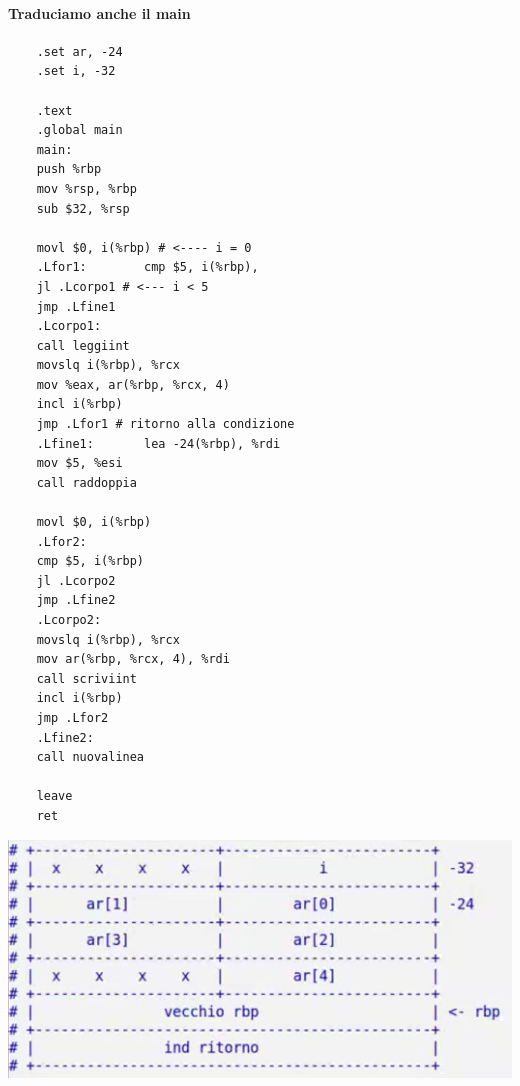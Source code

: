 \paragraph{Traduciamo anche il main}
\begin{verbatim}
	.set ar, -24
	.set i, -32
	
	.text
	.global main
	main:
	push %rbp
	mov %rsp, %rbp
	sub $32, %rsp
	
	movl $0, i(%rbp) # <---- i = 0
	.Lfor1:        cmp $5, i(%rbp), 
	jl .Lcorpo1 # <--- i < 5
	jmp .Lfine1
	.Lcorpo1:
	call leggiint
	movslq i(%rbp), %rcx
	mov %eax, ar(%rbp, %rcx, 4)
	incl i(%rbp)
	jmp .Lfor1 # ritorno alla condizione 
	.Lfine1:       lea -24(%rbp), %rdi
	mov $5, %esi
	call raddoppia
	
	movl $0, i(%rbp)
	.Lfor2:
	cmp $5, i(%rbp)
	jl .Lcorpo2
	jmp .Lfine2
	.Lcorpo2:
	movslq i(%rbp), %rcx
	mov ar(%rbp, %rcx, 4), %rdi
	call scriviint
	incl i(%rbp)
	jmp .Lfor2
	.Lfine2:
	call nuovalinea
	
	leave
	ret
\end{verbatim}
\begin{center}
	\includegraphics[scale=.9]{img/23.PNG}
\end{center} 
